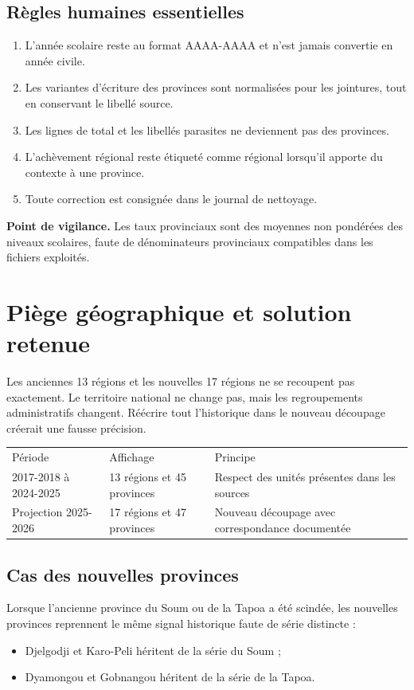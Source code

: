 \documentclass[12pt,a4paper]{article}
\newcommand{\note}[1]{\colorbox{SoftOrange}{\parbox{0.96\linewidth}{\textbf{\color{Orange}Point de vigilance.} #1}}}
\begin{document}
\subsection{Règles humaines essentielles}
\begin{enumerate}
  \item L'année scolaire reste au format AAAA-AAAA et n'est jamais convertie en année civile.
  \item Les variantes d'écriture des provinces sont normalisées pour les jointures, tout en conservant le libellé source.
  \item Les lignes de total et les libellés parasites ne deviennent pas des provinces.
  \item L'achèvement régional reste étiqueté comme régional lorsqu'il apporte du contexte à une province.
  \item Toute correction est consignée dans le journal de nettoyage.
\end{enumerate}

\note{Les taux provinciaux sont des moyennes non pondérées des niveaux scolaires, faute de dénominateurs provinciaux compatibles dans les fichiers exploités.}
\clearpage
\thispagestyle{fancy}

\section{Piège géographique et solution retenue}
Les anciennes 13 régions et les nouvelles 17 régions ne se recoupent pas exactement. Le territoire national ne change pas, mais les regroupements administratifs changent. Réécrire tout l'historique dans le nouveau découpage créerait une fausse précision.

\begin{tabularx}{\textwidth}{p{3.2cm} p{4.8cm} X}
\rowcolor{Navy}\color{white}Période & \color{white}Affichage & \color{white}Principe\\
2017-2018 à 2024-2025 & 13 régions et 45 provinces & Respect des unités présentes dans les sources\\
Projection 2025-2026 & 17 régions et 47 provinces & Nouveau découpage avec correspondance documentée\\
\end{tabularx}

\subsection{Cas des nouvelles provinces}
Lorsque l'ancienne province du Soum ou de la Tapoa a été scindée, les nouvelles provinces reprennent le même signal historique faute de série distincte :
\begin{itemize}
  \item Djelgodji et Karo-Peli héritent de la série du Soum ;
  \item Dyamongou et Gobnangou héritent de la série de la Tapoa.
\end{itemize}
\end{document}

